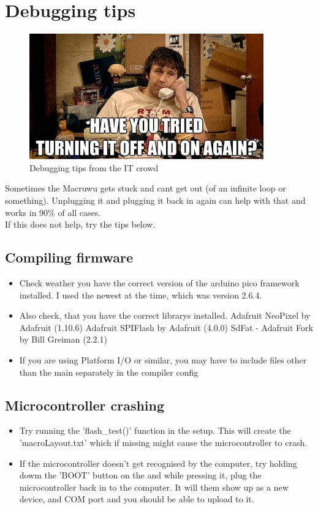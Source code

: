 \documentclass[english, 12pt]{scrartcl}
\begin{document}
	\section{Debugging tips}
	\begin{figure}[H]
		\centering
		\includegraphics[width=0.9\textwidth]{debugging}
		\caption{Debugging tips from the IT crowd}
	\end{figure}
	Sometimes the Macruwu gets stuck and cant get out (of an infinite loop or something). Unplugging it and plugging it back in again can help with that and works in 90\% of all cases.\\
	If this does not help, try the tips below.
	\subsection{Compiling firmware}
	\begin{itemize}
		\item Check weather you have the correct version of the arduino pico framework installed. I used the newest at the time, which was version 2.6.4.
		\item Also check, that you have the correct librarys installed.
		\subitem Adafruit NeoPixel by Adafruit (1.10.6)
		\subitem Adafruit SPIFlash by Adafruit (4.0.0)
		\subitem SdFat - Adafruit Fork by Bill Greiman (2.2.1)
		\item If you are using Platform I/O or similar, you may have to include files other than the main separately in the compiler config
	\end{itemize}
	\subsection{Microcontroller crashing}
	\begin{itemize}
		\item Try running the 'flash\_test()' function in the setup. This will create the 'macroLayout.txt' which if missing might cause the microcontroller to crash.
		\item If the microcontroller doesn't get recognised by the computer, try holding dowm the 'BOOT' button on the and while pressing it, plug the microcontroller back in to the computer. It will them show up as a new device, and COM port and you should be able to upload to it.
	\end{itemize}
\end{document}
